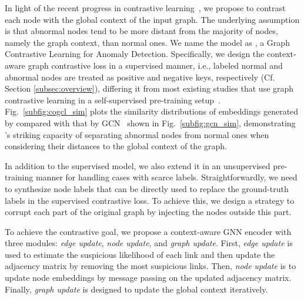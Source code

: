 In light of the recent progress in contrastive learning~\cite{wu2018unsupervised,he2020momentum}, we propose to contrast each node with the global context of the input graph. 
The underlying assumption is that abnormal nodes tend to be more distant from the majority of nodes, namely the graph context, than normal ones. We name the model as \model, a %
Graph Contrastive Learning for Anomaly Detection.
Specifically, we design the context-aware graph contrastive loss in a supervised manner, i.e., labeled normal and abnormal nodes are treated as positive and negative keys, respectively (Cf. Section \ref{subsec:overview}), differing it from most existing studies that use graph contrastive learning in a self-supervised pre-training setup~\cite{you2020graph,velickovic2019deep,qiu2020gcc}. 
Fig.~\ref{subfig:cogcl_sim} plots the similarity distributions of embeddings generated by \smodel compared with that by GCN~\cite{kipf2016semi} shown in Fig.~\ref{subfig:gcn_sim}, demonstrating \model's striking capacity of separating abnormal nodes from normal ones when considering their distances to the global context of the graph.


In addition to the supervised \smodel model, we also extend it in an unsupervised pre-training manner \spmodel for handling cases with scarce labels. 
Straightforwardly, we need to synthesize node labels that can be directly used to replace the ground-truth labels in the supervised contrastive loss. 
To achieve this, we design a strategy to corrupt each part of the original graph by injecting the nodes outside this part. 


To achieve the contrastive goal, we propose a context-aware GNN encoder with three modules: \textit{edge update}, \textit{node update}, and \textit{graph update}. 
First, \textit{edge update} is used to estimate the suspicious likelihood of each link and then update the adjacency matrix by removing the most suspicious links. 
Then, \textit{node update} is to update node embeddings by message passing on the updated adjacency matrix. 
Finally, \textit{graph update} is designed to update the global context iteratively. 


